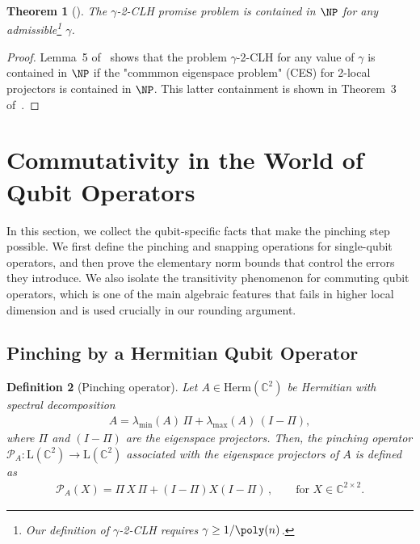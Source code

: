 \documentclass[a4paper,onecolumn,11pt]{quantumarticle}
\theoremstyle{plain}
\newtheorem{theorem}{Theorem}[section]
\newtheorem{definition}[theorem]{Definition}
\begin{document}
\begin{theorem}[\cite{bravyi2004commutativeversionklocalhamiltonian}]
\label{thm:clh-in-np}
    The $\gamma$-2-CLH promise problem is contained in $\NP$ for any admissible\footnote{Our definition of $\gamma$-2-CLH requires $\gamma \geq 1/\poly(n)$.} $\gamma$.
\end{theorem}
\begin{proof}
    Lemma~5 of~\cite{bravyi2004commutativeversionklocalhamiltonian} shows that the problem $\gamma$-2-CLH for any value of $\gamma$ is contained in $\NP$ if the "commmon eigenspace problem" (CES) for 2-local projectors is contained in $\NP$. This latter containment is shown in Theorem~3 of~\cite{bravyi2004commutativeversionklocalhamiltonian}.
\end{proof}


\section{Commutativity in the World of Qubit Operators}

In this section, we collect the qubit-specific facts that make the
pinching step possible.  We first define the pinching and snapping
operations for single-qubit operators, and then prove the elementary norm
bounds that control the errors they introduce.  We also isolate the
transitivity phenomenon for commuting qubit operators, which is one of the
main algebraic features that fails in higher local dimension and is used
crucially in our rounding argument.

\subsection{Pinching by a Hermitian Qubit Operator}

\begin{definition}[Pinching operator]\label{def:pinching-operator}
Let $A \in \mathrm{Herm}(\mathbb{C}^{2})$ be Hermitian with spectral decomposition 
\begin{align}
A = \lambda_{\min}(A)\,\Pi + \lambda_{\max}(A)\,(I-\Pi),
\end{align}
where $\Pi$ and $(I-\Pi)$ are the eigenspace projectors. Then, the pinching operator $\mathcal{P}_A: \mathrm{L}(\mathbb{C}^{2})\rightarrow \mathrm{L}(\mathbb{C}^{2})$ associated with the eigenspace projectors of $A$ is defined as
\begin{align}
    \mathcal{P}_A(X) = \Pi \, X \, \Pi + (I-\Pi) X (I-\Pi)\, , \quad\quad \text{for } X \in \mathbb{C}^{2 \times 2}.
    \end{align}
    
\end{definition}
\end{document}
